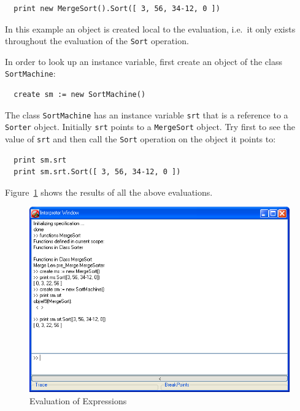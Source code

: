 \documentclass[\pformat,12pt]{article}
\begin{document}
\begin{verbatim}
  print new MergeSort().Sort([ 3, 56, 34-12, 0 ])
\end{verbatim}

In this example an object is created local to the evaluation, i.e.\ 
it only exists throughout the evaluation of the {\tt Sort} operation.

In order to look up an instance variable, first create an object of
the class {\tt SortMachine}:

\begin{verbatim}
  create sm := new SortMachine()
\end{verbatim}

The class {\tt SortMachine} has an instance variable {\tt srt} that is
a reference to a {\tt Sorter} object.  Initially {\tt srt} points
to a {\tt MergeSort} object.  Try first to see the value of {\tt srt}
and then call the {\tt Sort} operation on the object it points to:

\begin{verbatim}
  print sm.srt
  print sm.srt.Sort([ 3, 56, 34-12, 0 ])
\end{verbatim}

Figure~\ref{fig:evalgui} shows the results of all the above
evaluations.


\begin{figure}[tbh]
\begin{center}
\mbox{}
\includegraphics[width=15cm]{evalExpr-ppENG.png}
\caption{Evaluation of Expressions}
\label{fig:evalgui}
\end{center}
\end{figure}
\end{document}
